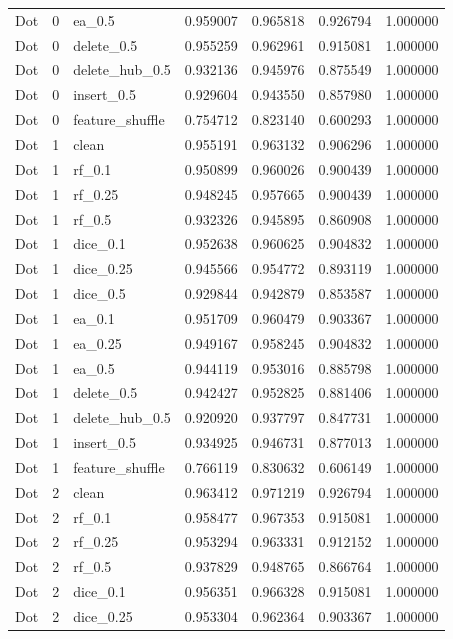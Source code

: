\documentclass[UTF8,a4paper,11pt,fontset=fandol]{ctexart}
\begin{document}
{\begin{longtable}{lrlrrrr}
Dot & 0 & ea\_0.5 & 0.959007 & 0.965818 & 0.926794 & 1.000000 \\
Dot & 0 & delete\_0.5 & 0.955259 & 0.962961 & 0.915081 & 1.000000 \\
Dot & 0 & delete\_hub\_0.5 & 0.932136 & 0.945976 & 0.875549 & 1.000000 \\
Dot & 0 & insert\_0.5 & 0.929604 & 0.943550 & 0.857980 & 1.000000 \\
Dot & 0 & feature\_shuffle & 0.754712 & 0.823140 & 0.600293 & 1.000000 \\
Dot & 1 & clean & 0.955191 & 0.963132 & 0.906296 & 1.000000 \\
Dot & 1 & rf\_0.1 & 0.950899 & 0.960026 & 0.900439 & 1.000000 \\
Dot & 1 & rf\_0.25 & 0.948245 & 0.957665 & 0.900439 & 1.000000 \\
Dot & 1 & rf\_0.5 & 0.932326 & 0.945895 & 0.860908 & 1.000000 \\
Dot & 1 & dice\_0.1 & 0.952638 & 0.960625 & 0.904832 & 1.000000 \\
Dot & 1 & dice\_0.25 & 0.945566 & 0.954772 & 0.893119 & 1.000000 \\
Dot & 1 & dice\_0.5 & 0.929844 & 0.942879 & 0.853587 & 1.000000 \\
Dot & 1 & ea\_0.1 & 0.951709 & 0.960479 & 0.903367 & 1.000000 \\
Dot & 1 & ea\_0.25 & 0.949167 & 0.958245 & 0.904832 & 1.000000 \\
Dot & 1 & ea\_0.5 & 0.944119 & 0.953016 & 0.885798 & 1.000000 \\
Dot & 1 & delete\_0.5 & 0.942427 & 0.952825 & 0.881406 & 1.000000 \\
Dot & 1 & delete\_hub\_0.5 & 0.920920 & 0.937797 & 0.847731 & 1.000000 \\
Dot & 1 & insert\_0.5 & 0.934925 & 0.946731 & 0.877013 & 1.000000 \\
Dot & 1 & feature\_shuffle & 0.766119 & 0.830632 & 0.606149 & 1.000000 \\
Dot & 2 & clean & 0.963412 & 0.971219 & 0.926794 & 1.000000 \\
Dot & 2 & rf\_0.1 & 0.958477 & 0.967353 & 0.915081 & 1.000000 \\
Dot & 2 & rf\_0.25 & 0.953294 & 0.963331 & 0.912152 & 1.000000 \\
Dot & 2 & rf\_0.5 & 0.937829 & 0.948765 & 0.866764 & 1.000000 \\
Dot & 2 & dice\_0.1 & 0.956351 & 0.966328 & 0.915081 & 1.000000 \\
Dot & 2 & dice\_0.25 & 0.953304 & 0.962364 & 0.903367 & 1.000000 \\

\end{longtable}}
\end{document}
